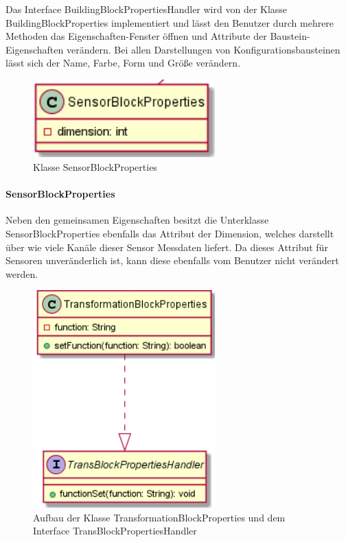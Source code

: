 \documentclass[parskip=full]{scrartcl}
\begin{document}
Das Interface BuildingBlockPropertiesHandler wird von der Klasse BuildingBlockProperties implementiert und lässt den Benutzer durch mehrere Methoden das Eigenschaften-Fenster öffnen und Attribute der Baustein-Eigenschaften verändern. Bei allen Darstellungen von Konfigurationsbausteinen lässt sich der Name, Farbe, Form und Größe verändern.

\begin{figure}[htbp]
	\begin{center}
		\includegraphics[width = 7cm]{Grafiken/View/SensorBlockProperties.PNG}
		\caption{Klasse SensorBlockProperties}
		\label{SensorBlockProperties}
	\end{center}
\end{figure}

\paragraph{SensorBlockProperties}

Neben den gemeinsamen Eigenschaften besitzt die Unterklasse SensorBlockProperties ebenfalls das Attribut der Dimension, welches darstellt über wie viele Kanäle dieser Sensor Messdaten liefert. Da dieses Attribut für Sensoren unveränderlich ist, kann diese ebenfalls vom Benutzer nicht verändert werden.

\begin{figure}[htbp]
	\begin{center}
		\includegraphics[width = 7cm]{Grafiken/View/TransformationBlockProperties.PNG}
		\caption{Aufbau der Klasse TransformationBlockProperties und dem Interface TransBlockPropertiesHandler}
		\label{Entwurf_Grob}
	\end{center}
\end{figure}
\end{document}
